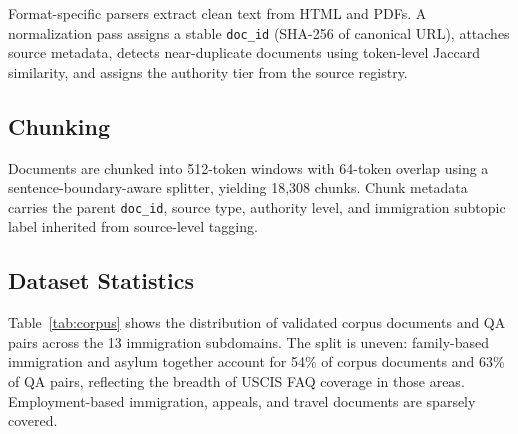 \documentclass[11pt]{article}
\begin{document}
Format-specific parsers extract clean text from HTML and PDFs. A normalization pass assigns a stable \texttt{doc\_id} (SHA-256 of canonical URL), attaches source metadata, detects near-duplicate documents using token-level Jaccard similarity, and assigns the authority tier from the source registry.

\subsection{Chunking}
Documents are chunked into 512-token windows with 64-token overlap using a sentence-boundary-aware splitter, yielding 18,308 chunks. Chunk metadata carries the parent \texttt{doc\_id}, source type, authority level, and immigration subtopic label inherited from source-level tagging.

\subsection{Dataset Statistics}
\label{sec:datastats}

Table~\ref{tab:corpus} shows the distribution of validated corpus documents and QA pairs across the 13 immigration subdomains. The split is uneven: family-based immigration and asylum together account for 54\% of corpus documents and 63\% of QA pairs, reflecting the breadth of USCIS FAQ coverage in those areas. Employment-based immigration, appeals, and travel documents are sparsely covered.
\end{document}
